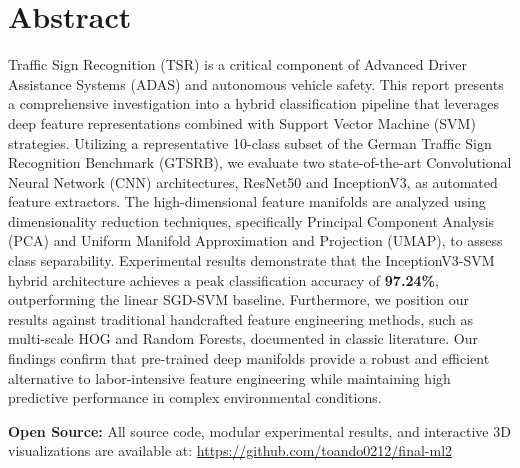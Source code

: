 \chapter*{Abstract}
Traffic Sign Recognition (TSR) is a critical component of Advanced Driver Assistance Systems (ADAS) and autonomous vehicle safety. This report presents a comprehensive investigation into a hybrid classification pipeline that leverages deep feature representations combined with Support Vector Machine (SVM) strategies. Utilizing a representative 10-class subset of the German Traffic Sign Recognition Benchmark (GTSRB), we evaluate two state-of-the-art Convolutional Neural Network (CNN) architectures, ResNet50 and InceptionV3, as automated feature extractors. The high-dimensional feature manifolds are analyzed using dimensionality reduction techniques, specifically Principal Component Analysis (PCA) and Uniform Manifold Approximation and Projection (UMAP), to assess class separability. Experimental results demonstrate that the InceptionV3-SVM hybrid architecture achieves a peak classification accuracy of \textbf{97.24\%}, outperforming the linear SGD-SVM baseline. Furthermore, we position our results against traditional handcrafted feature engineering methods, such as multi-scale HOG and Random Forests, documented in classic literature. Our findings confirm that pre-trained deep manifolds provide a robust and efficient alternative to labor-intensive feature engineering while maintaining high predictive performance in complex environmental conditions.

\vspace{0.5cm}
\noindent \textbf{Open Source:} All source code, modular experimental results, and interactive 3D visualizations are available at: \url{https://github.com/toando0212/final-ml2}
